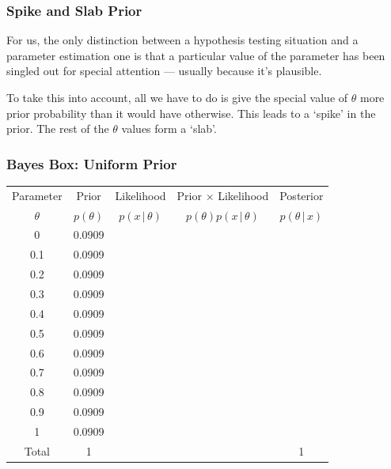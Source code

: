 \documentclass{beamer}
\newcommand{\given}{\,|\,}
\begin{document}
\begin{frame}
\frametitle{Spike and Slab Prior}
For us, the only distinction between a hypothesis testing situation and a
parameter estimation one is that a particular value of the parameter has
been singled out for special attention --- usually because it's plausible.\pause

To take this into account, all we have to do is give the special value of
$\theta$ more prior probability than it would have otherwise. This leads
to a `spike' in the prior. The rest of the $\theta$ values form a `slab'.
\end{frame}


\begin{frame}
\frametitle{Bayes Box: Uniform Prior}

\centering
{\footnotesize
\begin{tabular}{|c|c|c|c|c|}
\hline
Parameter & Prior & Likelihood & Prior $\times$ Likelihood & Posterior \\
$\theta$  & $p(\theta)$ & $p(x \given \theta)$ & $p(\theta)p(x\given \theta)$ & $p(\theta\given x)$ \\
\hline
0 & 0.0909 &  & & \\
0.1 & 0.0909  &   & & \\
0.2 & 0.0909 &  &  &  \\
0.3 & 0.0909 &  &  &  \\
0.4 & 0.0909 &  &  &  \\
0.5 & 0.0909 &  &  &  \\
0.6 & 0.0909 &  &  &  \\
0.7 & 0.0909 &  &  &  \\
0.8 & 0.0909 &  &  &  \\
0.9 & 0.0909 &  &  &  \\
1 & 0.0909 &  &  &  \\
\hline
Total & 1 & & & 1 \\
\hline
\end{tabular}
}

\end{frame}
\end{document}
